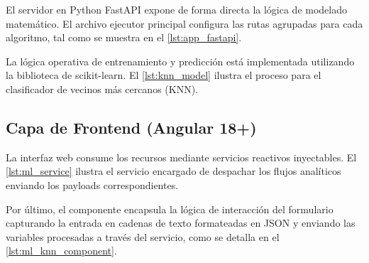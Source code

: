 El servidor en Python FastAPI expone de forma directa la lógica de modelado matemático. El archivo ejecutor principal configura las rutas agrupadas para cada algoritmo, tal como se muestra en el \autoref{lst:app_fastapi}.



La lógica operativa de entrenamiento y predicción está implementada utilizando la biblioteca de scikit-learn. El \autoref{lst:knn_model} ilustra el proceso para el clasificador de vecinos más cercanos (KNN).




\subsection{Capa de Frontend (Angular 18+)}

La interfaz web consume los recursos mediante servicios reactivos inyectables. El \autoref{lst:ml_service} ilustra el servicio encargado de despachar los flujos analíticos enviando los payloads correspondientes.



Por último, el componente encapsula la lógica de interacción del formulario capturando la entrada en cadenas de texto formateadas en JSON y enviando las variables procesadas a través del servicio, como se detalla en el \autoref{lst:ml_knn_component}.


